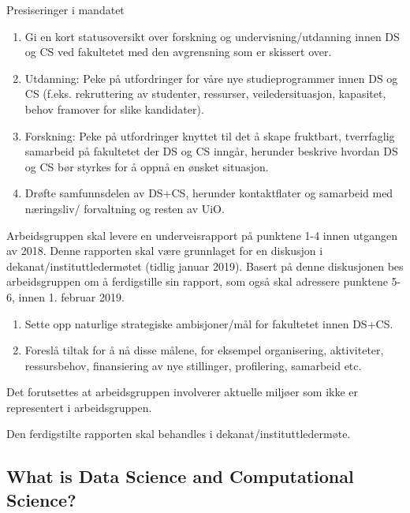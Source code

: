 \documentclass[a4paper,10pt]{article}
\newcounter{save}
\begin{document}
Presiseringer i mandatet
\begin{enumerate}
\item Gi en kort statusoversikt over forskning og undervisning/utdanning innen DS og CS
ved fakultetet med den avgrensning som er skissert over.
\item Utdanning: Peke på utfordringer for våre nye studieprogrammer innen DS og CS
(f.eks. rekruttering av studenter, ressurser, veiledersituasjon, kapasitet, behov
framover for slike kandidater).
\item Forskning: Peke på utfordringer knyttet til det å skape fruktbart, tverrfaglig
samarbeid på fakultetet der DS og CS inngår, herunder beskrive hvordan DS og CS
bør styrkes for å oppnå en ønsket situasjon.
\item Drøfte samfunnsdelen av DS+CS, herunder kontaktflater og samarbeid med
næringsliv/ forvaltning og resten av UiO.
\setcounter{save}{\value{enumi}}
\end{enumerate}
Arbeidsgruppen skal levere en underveisrapport på punktene 1-4 innen utgangen av 2018.
Denne rapporten skal være grunnlaget for en diskusjon i dekanat/instituttledermøtet
(tidlig januar 2019). Basert på denne diskusjonen bes arbeidsgruppen om å ferdigstille sin
rapport, som også skal adressere punktene 5-6, innen 1. februar 2019.
\begin{enumerate}
\setcounter{enumi}{\value{save}}
\item Sette opp naturlige strategiske ambisjoner/mål for fakultetet innen DS+CS.
\item Foreslå tiltak for å nå disse målene, for eksempel organisering, aktiviteter,
ressursbehov, finansiering av nye stillinger, profilering, samarbeid etc.
\end{enumerate}
Det forutsettes at arbeidsgruppen involverer aktuelle miljøer som ikke er representert i
arbeidsgruppen.

Den ferdigstilte rapporten skal behandles i dekanat/instituttledermøte.

\subsection{What is Data Science and Computational Science?}
\end{document}
